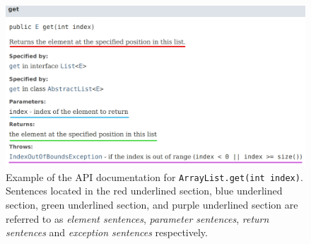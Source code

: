 \begin{figure}[h]
	\label{fig:api-doc-eg}
	\centering
	\includegraphics[width=\textwidth]{figs/api-doc-eg-highlight.png}
	\caption{Example of the API documentation for \lstinline{ArrayList.get(int index)}. Sentences located in the red underlined section, blue underlined section, green underlined section, and purple underlined section are referred to as \textit{element sentences}, \textit{parameter sentences}, \textit{return sentences} and \textit{exception sentences} respectively.}
\end{figure}
\clearpage

